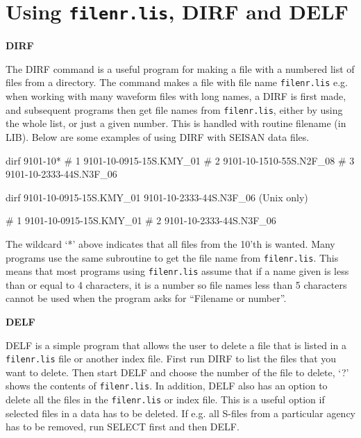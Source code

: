 \section{Using \texttt{filenr.lis}, DIRF and DELF}
\label{sect:dirf} 

\textbf{DIRF}

The DIRF command is a useful program for making a file with a numbered list of files from a directory. The command makes a file with file name \texttt{filenr.lis} e.g. when working with many waveform files with long names, a DIRF is first made, and subsequent programs then get file names from \texttt{filenr.lis}, either by using the whole list, or just a given number. This is handled with routine filename (in LIB). Below are some examples of using DIRF with SEISAN data files. 

\begin{boxedverbatim}
 dirf 9101-10* 
 #  1  9101-10-0915-15S.KMY_01
 #  2  9101-10-1510-55S.N2F_08
 #  3  9101-10-2333-44S.N3F_06 


 dirf 9101-10-0915-15S.KMY_01 9101-10-2333-44S.N3F_06          (Unix only) 

 #  1  9101-10-0915-15S.KMY_01
 #  2  9101-10-2333-44S.N3F_06 

\end{boxedverbatim}

The wildcard `*' above indicates that all files from 
the 10'th is wanted. Many programs use the same subroutine to get 
the file name from \texttt{filenr.lis}. This means that most programs using 
\texttt{filenr.lis} assume that if a name given is less than or equal to 4 
characters, it is a number so file names less than 5 characters cannot 
be used when the program asks for ``Filename or number''. 

\textbf{DELF}

DELF is a simple program that allows the user to delete 
a file that is listed in a \texttt{filenr.lis} file or another index file. 
First run DIRF to list the files that you want to delete. Then start 
DELF and choose the number of the file to delete, `?' shows the 
contents of \texttt{filenr.lis}. In addition, DELF also has an option to 
delete all the files in the \texttt{filenr.lis} or index file. This is a 
useful option if selected files in a data has to be deleted. If e.g. 
all S-files from a particular agency has to be removed, run SELECT 
first and then DELF. 

